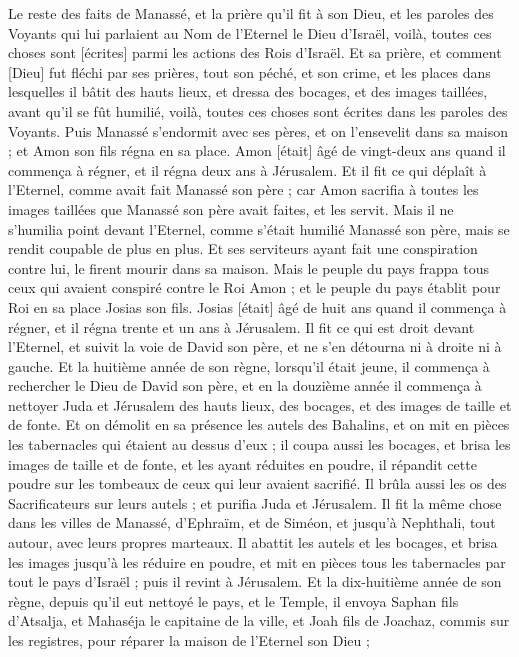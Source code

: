 \begin{multicols}{2}
Le reste des faits de Manassé, et la prière qu'il fit à son Dieu, et les paroles des Voyants qui lui parlaient au Nom de l'Eternel le Dieu d'Israël, voilà, toutes ces choses sont [écrites] parmi les actions des Rois d'Israël.
Et sa prière, et comment [Dieu] fut fléchi par ses prières, tout son péché, et son crime, et les places dans lesquelles il bâtit des hauts lieux, et dressa des bocages, et des images taillées, avant qu'il se fût humilié, voilà, toutes ces choses sont écrites dans les paroles des Voyants.
Puis Manassé s'endormit avec ses pères, et on l'ensevelit dans sa maison ; et Amon son fils régna en sa place.
Amon [était] âgé de vingt-deux ans quand il commença à régner, et il régna deux ans à Jérusalem.
Et il fit ce qui déplaît à l'Eternel, comme avait fait Manassé son père ; car Amon sacrifia à toutes les images taillées que Manassé son père avait faites, et les servit.
Mais il ne s'humilia point devant l'Eternel, comme s'était humilié Manassé son père, mais se rendit coupable de plus en plus.
Et ses serviteurs ayant fait une conspiration contre lui, le firent mourir dans sa maison.
Mais le peuple du pays frappa tous ceux qui avaient conspiré contre le Roi Amon ; et le peuple du pays établit pour Roi en sa place Josias son fils.
\VerseOne{}Josias [était] âgé de huit ans quand il commença à régner, et il régna trente et un ans à Jérusalem.
Il fit ce qui est droit devant l'Eternel, et suivit la voie de David son père, et ne s'en détourna ni à droite ni à gauche.
Et la huitième année de son règne, lorsqu'il était jeune, il commença à rechercher le Dieu de David son père, et en la douzième année il commença à nettoyer Juda et Jérusalem des hauts lieux, des bocages, et des images de taille et de fonte.
Et on démolit en sa présence les autels des Bahalins, et on mit en pièces les tabernacles qui étaient au dessus d'eux ; il coupa aussi les bocages, et brisa les images de taille et de fonte, et les ayant réduites en poudre, il répandit cette poudre sur les tombeaux de ceux qui leur avaient sacrifié.
Il brûla aussi les os des Sacrificateurs sur leurs autels ; et purifia Juda et Jérusalem.
Il fit la même chose dans les villes de Manassé, d'Ephraïm, et de Siméon, et jusqu'à Nephthali, tout autour, avec leurs propres marteaux.
Il abattit les autels et les bocages, et brisa les images jusqu'à les réduire en poudre, et mit en pièces tous les tabernacles par tout le pays d'Israël ; puis il revint à Jérusalem.
Et la dix-huitième année de son règne, depuis qu'il eut nettoyé le pays, et le Temple, il envoya Saphan fils d'Atsalja, et Mahaséja le capitaine de la ville, et Joah fils de Joachaz, commis sur les registres, pour réparer la maison de l'Eternel son Dieu ;

\end{multicols}
